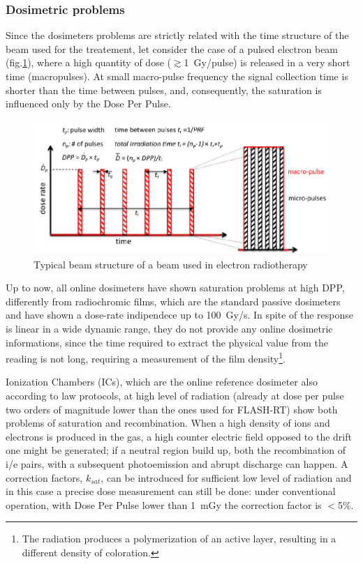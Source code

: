         \subsubsection{Dosimetric problems}
            Since the dosimeters problems are strictly related with the time structure of the beam used for the treatement, let consider the case of a pulsed electron beam (fig.\ref{fig:beam_structure}), where a high quantity of dose ($\gtrsim$\SI{1}{Gy/pulse}) is released in a very short time (macropulses).            
            At small macro-pulse frequency the signal collection time is shorter than the time between pulses, and, consequently, the saturation is influenced only by the Dose Per Pulse.
            \begin{figure}
                \centering
                \includegraphics[width=.9\linewidth]{figures/test_beam/beam_structure.pdf}
                \caption{Typical beam structure of a beam used in electron radiotherapy}
                \label{fig:beam_structure}
            \end{figure} 
                    
            Up to now, all online dosimeters have shown saturation problems at high DPP, differently from radiochromic films, which are the standard passive dosimeters and have shown a dose-rate indipendece up to \SI{100}{Gy/s}.
            In spite of the response is linear in a wide dynamic range, they do not provide any online dosimetric informations, since the time required to extract the physical value from the reading is not long, requiring a measurement of the film density\footnote{The radiation produces a polymerization of an active layer, resulting in a different density of coloration.}.

            Ionization Chambers (ICs), which are the online reference dosimeter also according to law protocols, at high level of radiation (already at dose per pulse two orders of magnitude lower than the ones used for FLASH-RT) show both problems of saturation and recombination. When a high density of ions and electrons is produced in the gas, a high counter electric field opposed to the drift one might be generated; if a neutral region build up, both the recombination of i/e pairs, with a subsequent photoemission and abrupt discharge can happen. A correction factors, $k_{sat}$, can be introduced for sufficient low level of radiation and in this case a precise dose measurement can still be done: under conventional operation, with Dose Per Pulse lower than \SI{1}{mGy} the correction factor is $<$5\%. 

